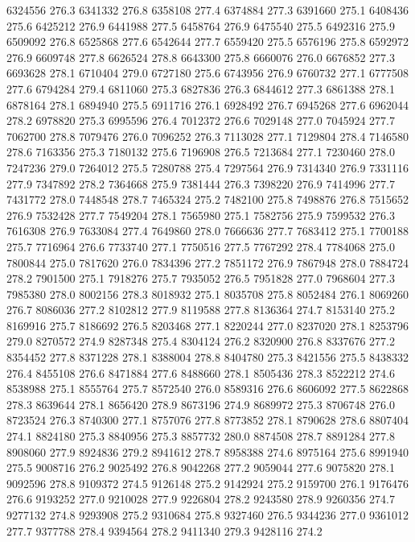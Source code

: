 6324556 276.3
6341332 276.8
6358108 277.4
6374884 277.3
6391660 275.1
6408436 275.6
6425212 276.9
6441988 277.5
6458764 276.9
6475540 275.5
6492316 275.9
6509092 276.8
6525868 277.6
6542644 277.7
6559420 275.5
6576196 275.8
6592972 276.9
6609748 277.8
6626524 278.8
6643300 275.8
6660076 276.0
6676852 277.3
6693628 278.1
6710404 279.0
6727180 275.6
6743956 276.9
6760732 277.1
6777508 277.6
6794284 279.4
6811060 275.3
6827836 276.3
6844612 277.3
6861388 278.1
6878164 278.1
6894940 275.5
6911716 276.1
6928492 276.7
6945268 277.6
6962044 278.2
6978820 275.3
6995596 276.4
7012372 276.6
7029148 277.0
7045924 277.7
7062700 278.8
7079476 276.0
7096252 276.3
7113028 277.1
7129804 278.4
7146580 278.6
7163356 275.3
7180132 275.6
7196908 276.5
7213684 277.1
7230460 278.0
7247236 279.0
7264012 275.5
7280788 275.4
7297564 276.9
7314340 276.9
7331116 277.9
7347892 278.2
7364668 275.9
7381444 276.3
7398220 276.9
7414996 277.7
7431772 278.0
7448548 278.7
7465324 275.2
7482100 275.8
7498876 276.8
7515652 276.9
7532428 277.7
7549204 278.1
7565980 275.1
7582756 275.9
7599532 276.3
7616308 276.9
7633084 277.4
7649860 278.0
7666636 277.7
7683412 275.1
7700188 275.7
7716964 276.6
7733740 277.1
7750516 277.5
7767292 278.4
7784068 275.0
7800844 275.0
7817620 276.0
7834396 277.2
7851172 276.9
7867948 278.0
7884724 278.2
7901500 275.1
7918276 275.7
7935052 276.5
7951828 277.0
7968604 277.3
7985380 278.0
8002156 278.3
8018932 275.1
8035708 275.8
8052484 276.1
8069260 276.7
8086036 277.2
8102812 277.9
8119588 277.8
8136364 274.7
8153140 275.2
8169916 275.7
8186692 276.5
8203468 277.1
8220244 277.0
8237020 278.1
8253796 279.0
8270572 274.9
8287348 275.4
8304124 276.2
8320900 276.8
8337676 277.2
8354452 277.8
8371228 278.1
8388004 278.8
8404780 275.3
8421556 275.5
8438332 276.4
8455108 276.6
8471884 277.6
8488660 278.1
8505436 278.3
8522212 274.6
8538988 275.1
8555764 275.7
8572540 276.0
8589316 276.6
8606092 277.5
8622868 278.3
8639644 278.1
8656420 278.9
8673196 274.9
8689972 275.3
8706748 276.0
8723524 276.3
8740300 277.1
8757076 277.8
8773852 278.1
8790628 278.6
8807404 274.1
8824180 275.3
8840956 275.3
8857732 280.0
8874508 278.7
8891284 277.8
8908060 277.9
8924836 279.2
8941612 278.7
8958388 274.6
8975164 275.6
8991940 275.5
9008716 276.2
9025492 276.8
9042268 277.2
9059044 277.6
9075820 278.1
9092596 278.8
9109372 274.5
9126148 275.2
9142924 275.2
9159700 276.1
9176476 276.6
9193252 277.0
9210028 277.9
9226804 278.2
9243580 278.9
9260356 274.7
9277132 274.8
9293908 275.2
9310684 275.8
9327460 276.5
9344236 277.0
9361012 277.7
9377788 278.4
9394564 278.2
9411340 279.3
9428116 274.2
